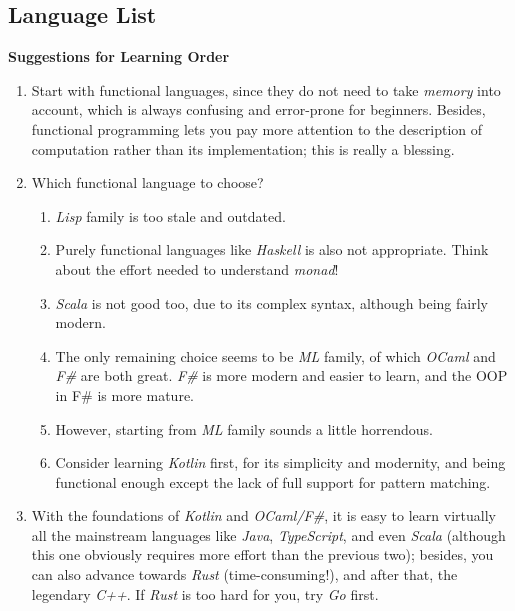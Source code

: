 \documentclass{article}
\begin{document}
\subsection{Language List}

\textbf{Suggestions for Learning Order}

\begin{enumerate}
    \item Start with functional languages, since they do not need to take \emph{memory} into account, which is always confusing and error-prone for beginners.
    Besides, functional programming lets you pay more attention to the description of computation rather than its implementation; this is really a blessing.
    \item Which functional language to choose?
    \begin{enumerate}
        \item \emph{Lisp} family is too stale and outdated.
        \item Purely functional languages like \emph{Haskell} is also not appropriate.
        Think about the effort needed to understand \emph{monad}!
        \item \emph{Scala} is not good too, due to its complex syntax, although being fairly modern.
        \item The only remaining choice seems to be \emph{ML} family, of which \emph{OCaml} and \emph{F\#} are both great. \emph{F\#} is more modern and easier to learn, and the OOP in F\# is more mature.
        \item However, starting from \emph{ML} family sounds a little horrendous.
        \item Consider learning \emph{Kotlin} first, for its simplicity and modernity, and being functional enough except the lack of full support for pattern matching.
    \end{enumerate}
    \item With the foundations of \emph{Kotlin} and \emph{OCaml/F\#}, it is easy to learn virtually all the mainstream languages like \emph{Java}, \emph{TypeScript}, and even \emph{Scala} (although this one obviously requires more effort than the previous two); besides, you can also advance towards \emph{Rust} (time-consuming!), and after that, the legendary \emph{C++}.
    If \emph{Rust} is too hard for you, try \emph{Go} first.
\end{enumerate}
\end{document}
